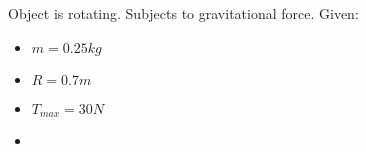 

Object is rotating. Subjects to gravitational force.
Given: 

\begin{itemize}
    \item $  m  = 0.25kg $
    \item $ R = 0.7m $
    \item $ T_{max} = 30N $
    \item $  $
\end{itemize}
